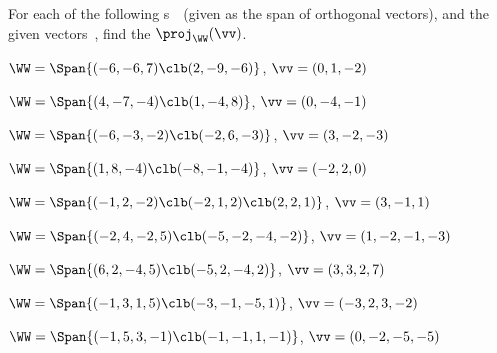 \begin{exercise}  
For each of the following s~\WW\ (given as the span of orthogonal vectors), and the given vectors~\vv, find the  \(\proj_\WW(\vv)\). 

\begin{Parts}
\item \(\WW=\Span\{(-6,-6,7)\clb(2,-9,-6)\}\), \(\vv=(0,1,-2)\)

\begin{reduce}
\item \(\WW=\Span\{(4,-7,-4)\clb(1,-4,8)\}\), \(\vv=(0,-4,-1)\)

\item \(\WW=\Span\{(-6,-3,-2)\clb(-2,6,-3)\}\), \(\vv=(3,-2,-3)\)
\end{reduce}

\item \(\WW=\Span\{(1,8,-4)\clb(-8,-1,-4)\}\), \(\vv=(-2,2,0)\)

\item \(\WW=\Span\{(-1,2,-2)\clb(-2,1,2)\clb(2,2,1)\}\), \(\vv=(3,-1,1)\)
\answer{\(\proj_\WW(\vv)=\vv\)}

\begin{reduce}
\item \(\WW=\Span\{(-2,4,-2,5)\clb(-5,-2,-4,-2)\}\), \(\vv=(1,-2,-1,-3)\)

\item \(\WW=\Span\{(6,2,-4,5)\clb(-5,2,-4,2)\}\), \(\vv=(3,3,2,7)\)
\end{reduce}

\item \(\WW=\Span\{(-1,3,1,5)\clb(-3,-1,-5,1)\}\), \(\vv=(-3,2,3,-2)\)

\item \(\WW=\Span\{(-1,5,3,-1)\clb(-1,-1,1,-1)\}\), \(\vv=(0,-2,-5,-5)\)


\end{Parts}
\end{exercise}
